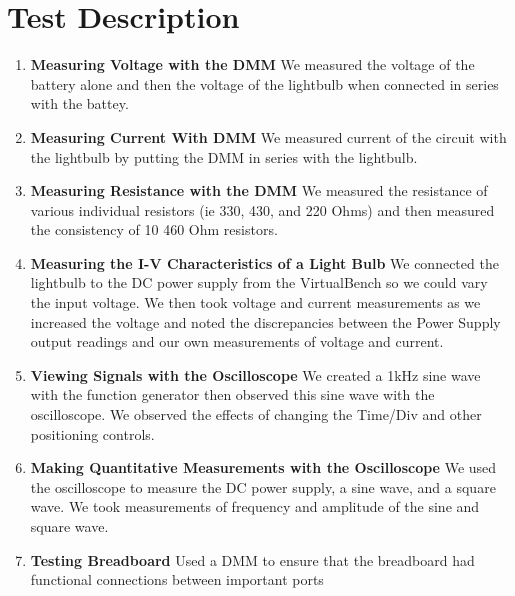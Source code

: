 \documentclass[10pt]{article}
\begin{document}
	\medskip
	
	
	\section{Test Description}
	
	\begin{enumerate}
		\item \textbf{Measuring Voltage with the DMM} We measured the voltage of the battery alone and then the voltage of the lightbulb when connected in series with the battey. 
		\item \textbf{Measuring Current With DMM} We measured current of the circuit with the lightbulb by putting the DMM in series with the lightbulb. 
		\item \textbf{Measuring Resistance with the DMM} We measured the resistance of various individual resistors (ie 330, 430, and 220 Ohms) and then measured the consistency of 10 460 Ohm resistors. 
		\item \textbf{Measuring the I-V Characteristics of a Light Bulb} We connected the lightbulb to the DC power supply from the VirtualBench so we could vary the input voltage. We then took voltage and current measurements as we increased the voltage and noted the discrepancies between the Power Supply output readings and our own measurements of voltage and current. 
		\item \textbf{Viewing Signals with the Oscilloscope} We created a 1kHz sine wave with the function generator then observed this sine wave with the oscilloscope. We observed the effects of changing the Time/Div and other positioning controls. 
		\item \textbf{Making Quantitative Measurements with the Oscilloscope} We used the oscilloscope to measure the DC power supply, a sine wave, and a square wave. We took measurements of frequency and amplitude of the sine and square wave. 
		\item \textbf{Testing Breadboard} Used a DMM to ensure that the breadboard had functional connections between important ports
	\end{enumerate}
	
	\medskip
	
	
\end{document}
